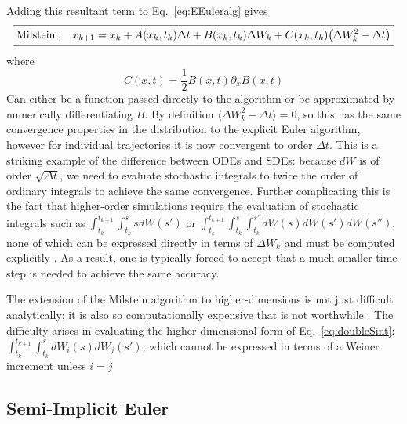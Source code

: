 \documentclass[onecolumn,notitlepage,pra,10pt,aps]{revtex4-1}
\newcommand {\be}{\begin{equation}}
\newcommand {\ee}{\end{equation}}
\newcommand{\expect}[1]{\langle#1\rangle}
\begin{document}
Adding this resultant term to Eq.~\eqref{eq:EEuleralg} gives 
\be
\boxed{
{\rm Milstein:}\quad x_{k+1} = x_{k} + A(x_k, t_k)\Delta t +B(x_k, t_k) \Delta W_k +C(x_k, t_k) \big(\Delta W_k^2-\Delta t\big)
 \label{eq:MillAlg}
}
\ee
where
\be
C(x, t)=\frac{1}{2}B(x,t)\partial_x B(x, t)
\ee
Can either be a function passed directly to the algorithm or be approximated by numerically differentiating $B$.  By definition $\expect{\Delta W_k^2-\Delta t}=0$, so this has the same convergence properties in the distribution to the  explicit Euler algorithm, however for individual trajectories it is now convergent to order $\Delta t$.  This is a striking example of the difference between ODEs and SDEs: because $dW$ is of order $\sqrt{\Delta t}$, we need to evaluate stochastic integrals to twice the order of ordinary integrals to achieve the same convergence.  Further complicating this is the fact that higher-order simulations require the evaluation of stochastic integrals such as $\int_{t_k}^{t_{k+1}} \int_{t_k}^s s dW(s')$ or $ \int_{t_k}^{t_{k+1}} \int_{t_k}^s \int_{t_k}^{s'}dW(s)dW(s')dW(s'')$, none of which can be expressed directly in terms of $\Delta W_k$ and must be computed explicitly \cite{Gardiner2004}.  As a result, one is typically forced to accept that a much smaller time-step is needed to achieve the same accuracy.

The extension of the Milstein algorithm to higher-dimensions is not just difficult analytically; it is also so computationally expensive that is not worthwhile \cite{Haugh2017}.  The difficulty arises in evaluating the higher-dimensional form of Eq.~\eqref{eq:doubleSint}:
$\int_{t_k}^{t_{k+1}} \int_{t_k}^s dW_i(s)dW_j(s')$, which cannot be expressed in terms of a Weiner increment unless $i=j$


\subsection{Semi-Implicit Euler}
\end{document}
